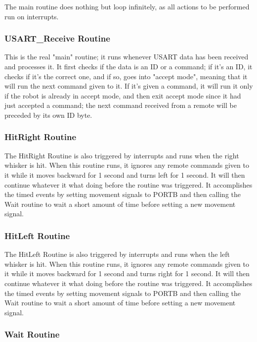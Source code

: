 \documentclass[12pt,letterpaper]{article}
\begin{document}
The main routine does nothing but loop infinitely, as all actions to be
performed run on interrupts.

\subsubsection{USART\_Receive Routine}

This is the real "main" routine; it runs whenever USART data has been received
and processes it.  It first checks if the data is an ID or a command; if it's
an ID, it checks if it's the correct one, and if so, goes into "accept mode",
meaning that it will run the next command given to it.  If it's given a
command, it will run it only if the robot is already in accept mode, and then
exit accept mode since it had just accepted a command; the next command
received from a remote will be preceded by its own ID byte.

\subsubsection{HitRight Routine}

The HitRight Routine is also triggered by interrupts and runs when the right
whisker is hit.  When this routine runs, it ignores any remote commands given
to it while it moves backward for 1 second and turns left for 1 second.  It
will then continue whatever it what doing before the routine was triggered.  It
accomplishes the timed events by setting movement signals to PORTB and then
calling the Wait routine to wait a short amount of time before setting a new
movement signal.

\subsubsection{HitLeft Routine}

The HitLeft Routine is also triggered by interrupts and runs when the left
whisker is hit.  When this routine runs, it ignores any remote commands given
to it while it moves backward for 1 second and turns right for 1 second.  It
will then continue whatever it what doing before the routine was triggered.  It
accomplishes the timed events by setting movement signals to PORTB and then
calling the Wait routine to wait a short amount of time before setting a new
movement signal.

\subsubsection{Wait Routine}
\end{document}
